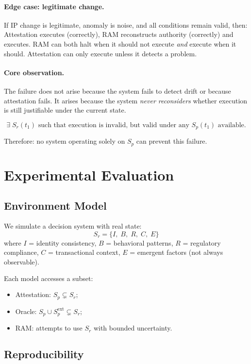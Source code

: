 \documentclass[11pt]{article}
\newcommand{\Sr}{S_r}
\newcommand{\Sp}{S_p}
\begin{document}
\paragraph{Edge case: legitimate change.}
If IP change is legitimate, anomaly is noise, and all conditions remain valid,
then: Attestation executes (correctly), RAM reconstructs authority (correctly)
and executes.
RAM can both halt when it should not execute \emph{and} execute when it should.
Attestation can only execute unless it detects a problem.

\paragraph{Core observation.}
The failure does not arise because the system fails to detect drift or because
attestation fails.
It arises because the system \emph{never reconsiders} whether execution is
still justifiable under the current state.

\[
\exists\; \Sr(t_1)\text{ such that execution is invalid, but valid under any }
\Sp(t_1)\text{ available.}
\]

Therefore: no system operating solely on $\Sp$ can prevent this failure.

\section{Experimental Evaluation}
\label{sec:exp}

\subsection{Environment Model}

We simulate a decision system with real state:
\[
\Sr = \{I,\; B,\; R,\; C,\; E\}
\]
where $I$ = identity consistency, $B$ = behavioral patterns,
$R$ = regulatory compliance, $C$ = transactional context,
$E$ = emergent factors (not always observable).

Each model accesses a subset:
\begin{itemize}
  \item Attestation: $\Sp \subsetneq \Sr$;
  \item Oracle: $\Sp \cup \Sp^{\text{ext}} \subsetneq \Sr$;
  \item RAM: attempts to use $\Sr$ with bounded uncertainty.
\end{itemize}

\subsection{Reproducibility}
\end{document}
